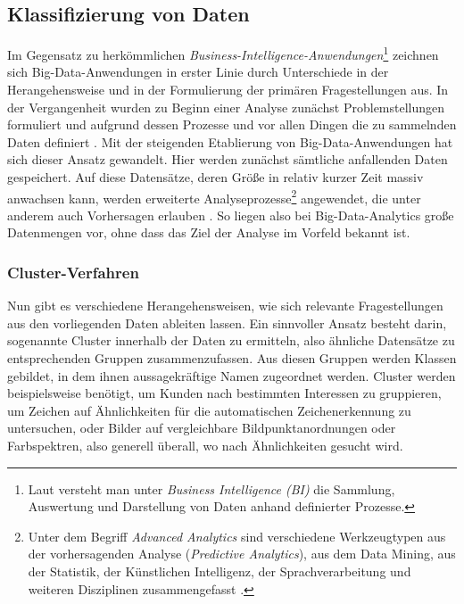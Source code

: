 \newpage

\subsection{Klassifizierung von Daten}
\label{section:klassifizierung von daten}


Im Gegensatz zu herkömmlichen \textit{Business-Intelligence-Anwendungen}\footnote{Laut  versteht man unter \textit{Business Intelligence (BI)} die Sammlung, Auswertung und Darstellung von Daten anhand definierter Prozesse.} zeichnen sich Big-Data-Anwendungen in erster Linie durch Unterschiede in der Herangehensweise und in der Formulierung der primären Fragestellungen aus. In der Vergangenheit wurden zu Beginn einer Analyse zunächst Problemstellungen formuliert und aufgrund dessen Prozesse und vor allen Dingen die zu sammelnden Daten definiert . Mit der steigenden Etablierung von Big-Data-Anwendungen hat sich dieser Ansatz gewandelt. Hier werden zunächst sämtliche anfallenden Daten gespeichert. Auf diese Datensätze, deren Größe in relativ kurzer Zeit massiv anwachsen kann, werden erweiterte Analyseprozesse\footnote{Unter dem Begriff \textit{Advanced Analytics} sind verschiedene Werkzeugtypen aus der vorhersagenden Analyse (\textit{Predictive Analytics}), aus dem Data Mining, aus der Statistik, der Künstlichen Intelligenz, der Sprachverarbeitung und weiteren Disziplinen zusammengefasst .} angewendet, die unter anderem auch Vorhersagen erlauben . 
So liegen also bei Big-Data-Analytics große Datenmengen vor, ohne dass das Ziel der Analyse im Vorfeld bekannt ist. 

\subsubsection{Cluster-Verfahren}
\label{section:clusterverfahren}

Nun gibt es verschiedene Herangehensweisen, wie sich relevante Fragestellungen aus den vorliegenden Daten ableiten lassen. Ein sinnvoller Ansatz besteht darin, sogenannte Cluster innerhalb der Daten zu ermitteln, also ähnliche Datensätze zu entsprechenden Gruppen zusammenzufassen. Aus diesen Gruppen werden Klassen gebildet, in dem ihnen aussagekräftige Namen zugeordnet werden. Cluster werden beispielsweise benötigt, um Kunden nach bestimmten Interessen zu gruppieren, um Zeichen auf Ähnlichkeiten für die automatischen Zeichenerkennung zu untersuchen, oder Bilder auf vergleichbare Bildpunktanordnungen oder Farbspektren, also generell überall, wo nach Ähnlichkeiten gesucht wird. 

